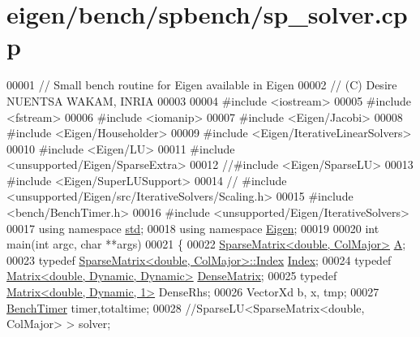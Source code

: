 \hypertarget{eigen_2bench_2spbench_2sp__solver_8cpp_source}{}\section{eigen/bench/spbench/sp\+\_\+solver.cpp}
\label{eigen_2bench_2spbench_2sp__solver_8cpp_source}

\begin{DoxyCode}
00001 \textcolor{comment}{// Small bench routine for Eigen available in Eigen}
00002 \textcolor{comment}{// (C) Desire NUENTSA WAKAM, INRIA}
00003 
00004 \textcolor{preprocessor}{#include <iostream>}
00005 \textcolor{preprocessor}{#include <fstream>}
00006 \textcolor{preprocessor}{#include <iomanip>}
00007 \textcolor{preprocessor}{#include <Eigen/Jacobi>}
00008 \textcolor{preprocessor}{#include <Eigen/Householder>}
00009 \textcolor{preprocessor}{#include <Eigen/IterativeLinearSolvers>}
00010 \textcolor{preprocessor}{#include <Eigen/LU>}
00011 \textcolor{preprocessor}{#include <unsupported/Eigen/SparseExtra>}
00012 \textcolor{comment}{//#include <Eigen/SparseLU>}
00013 \textcolor{preprocessor}{#include <Eigen/SuperLUSupport>}
00014 \textcolor{comment}{// #include <unsupported/Eigen/src/IterativeSolvers/Scaling.h>}
00015 \textcolor{preprocessor}{#include <bench/BenchTimer.h>}
00016 \textcolor{preprocessor}{#include <unsupported/Eigen/IterativeSolvers>}
00017 \textcolor{keyword}{using namespace }\hyperlink{namespacestd}{std};
00018 \textcolor{keyword}{using namespace }\hyperlink{namespace_eigen}{Eigen};
00019 
00020 \textcolor{keywordtype}{int} main(\textcolor{keywordtype}{int} argc, \textcolor{keywordtype}{char} **args)
00021 \{
00022   \hyperlink{group___sparse_core___module_class_eigen_1_1_sparse_matrix}{SparseMatrix<double, ColMajor>} \hyperlink{group___core___module_class_eigen_1_1_matrix}{A}; 
00023   \textcolor{keyword}{typedef} \hyperlink{group___sparse_core___module_class_eigen_1_1_sparse_matrix}{SparseMatrix<double, ColMajor>::Index} 
      \hyperlink{namespace_eigen_a62e77e0933482dafde8fe197d9a2cfde}{Index};
00024   \textcolor{keyword}{typedef} \hyperlink{group___core___module_class_eigen_1_1_matrix}{Matrix<double, Dynamic, Dynamic>} 
      \hyperlink{group___core___module}{DenseMatrix};
00025   \textcolor{keyword}{typedef} \hyperlink{group___core___module_class_eigen_1_1_matrix}{Matrix<double, Dynamic, 1>} DenseRhs;
00026   VectorXd b, x, tmp;
00027   \hyperlink{class_eigen_1_1_bench_timer}{BenchTimer} timer,totaltime; 
00028   \textcolor{comment}{//SparseLU<SparseMatrix<double, ColMajor> >   solver;}

\end{DoxyCode}

